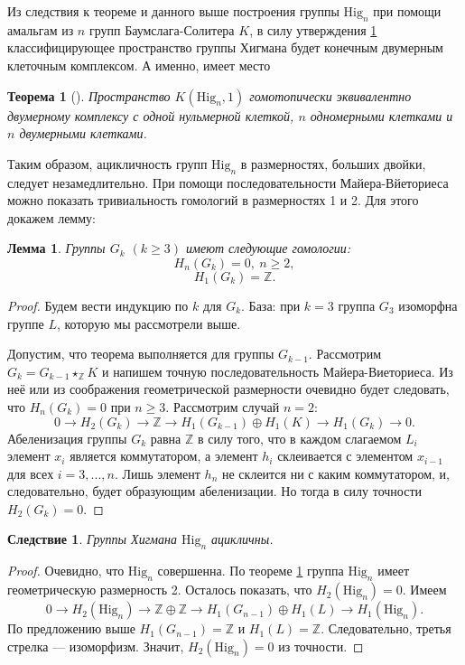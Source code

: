 \documentclass[14pt, dvipsnames, twoside]{extarticle}
\newtheorem{theorem}{Теорема}
\newtheorem{lemma}{Лемма}
\newtheorem{corollary}{Следствие}[theorem]
\theoremstyle{definition}
\theoremstyle{remark}
\begin{document}
Из следствия к теореме \cite{Vasquez} и данного выше построения группы $\mathrm{Hig}_n$ при помощи амальгам из $n$ групп Баумслага-Солитера $K$, в силу утверждения \ref{finite} классифицирующее пространство группы Хигмана будет конечным двумерным клеточным комплексом. А именно, имеет место

\begin{theorem}[\cite{Variations}]\label{finite}
Пространство $K(\mathrm{Hig}_n, 1)$ гомотопически эквивалентно двумерному комплексу с одной нульмерной клеткой, $n$ одномерными клетками и $n$ двумерными клетками.
\end{theorem}

Таким образом, ацикличность групп $\mathrm{Hig}_n$ в размерностях, больших двойки, следует незамедлительно. При помощи последовательности Майера-Вйеториеса можно показать тривиальность гомологий в размерностях 1 и 2. Для этого докажем лемму:
 



\begin{lemma}
Группы $G_k$ $(k\geqslant 3)$ имеют следующие гомологии: $$H_n(G_k)=0,\ n\geqslant 2,$$ $$H_1(G_k)=\mathbb{Z}.$$ 
\end{lemma}

\begin{proof}
Будем вести индукцию по $k$ для $G_k$. База: при $k=3$ группа $G_3$ изоморфна группе $L$, которую мы рассмотрели выше.

Допустим, что теорема выполняется для группы $G_{k-1}$. Рассмотрим $G_k=G_{k-1}\star_{\mathbb{Z}}K$ и напишем точную последовательность Майера-Виеториеса. Из неё или из соображения геометрической размерности очевидно будет следовать, что $H_n(G_k)=0$ при $n\geqslant 3$. Рассмотрим случай $n=2$: $$0\to H_2(G_k)\to \mathbb{Z}\to H_1(G_{k-1})\oplus H_1(K)\to H_1(G_k)\to 0.$$ Абеленизация группы $G_k$ равна $\mathbb{Z}$ в силу того, что в каждом слагаемом $L_i$ элемент $x_i$ является коммутатором, а элемент $h_i$ склеивается с элементом $x_{i-1}$ для всех $i=3, ..., n$. Лишь элемент $h_n$ не склеится ни с каким коммутатором, и, следовательно, будет образующим абеленизации. Но тогда в силу точности $H_2(G_k)=0$.   
\end{proof}

\begin{corollary}
Группы Хигмана $\mathrm{Hig}_n$ ацикличны.
\end{corollary}

\begin{proof}
Очевидно, что $\mathrm{Hig}_n$ совершенна. По теореме \ref{finite} группа $\mathrm{Hig}_n$ имеет геометрическую размерность 2. Осталось показать, что $H_2(\mathrm{Hig}_n)=0$. Имеем $$0\to H_2(\mathrm{Hig}_n)\to \mathbb{Z}\oplus\mathbb{Z}\to H_1(G_{n-1})\oplus H_{1}(L)\to H_1(\mathrm{Hig}_n).$$ По предложению выше $H_1(G_{n-1})=\mathbb{Z}$ и $H_1(L)=\mathbb{Z}$. Следовательно, третья стрелка --- изоморфизм. Значит, $H_2(\mathrm{Hig}_n)=0$ из точности.
\end{proof}
\end{document}
